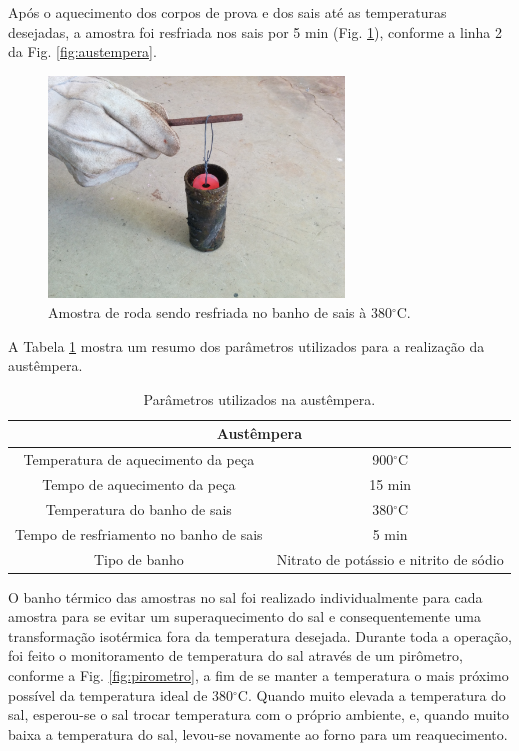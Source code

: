 \documentclass[
12pt,
openany, %
oneside, %
a4paper,			
english,			
brazil			        %
]{abntbibufjf}
\begin{document}
	Após o aquecimento dos corpos de prova e dos sais até as temperaturas desejadas, a amostra foi resfriada nos sais por 5 min (Fig. \ref{fig:resfriamento}), conforme a linha 2 da Fig. \ref{fig:austempera}.
	
	\begin{figure}[H]
		\centering
		\includegraphics[width=0.7\textwidth]{resfriamento}
		\caption{Amostra de roda sendo resfriada no banho de sais à 380$^{\circ}$C.}
		\label{fig:resfriamento}
	\end{figure}

	A Tabela \ref{tab:parametros_austempera} mostra um resumo dos parâmetros utilizados para a realização da austêmpera.
	
	\begin{table}[H]
		\centering
		\caption{Parâmetros utilizados na austêmpera.}
		\begin{tabular}{|cc|}
			\hline
			\multicolumn{2}{|c|}{Austêmpera} \bigstrut\\
			\hline
			Temperatura de aquecimento da peça & 900$^\circ$C \bigstrut[t]\\
			Tempo de aquecimento da peça & 15 min \\
			Temperatura do banho de sais & 380$^\circ$C \\
			Tempo de resfriamento no banho de sais & 5 min \\
			Tipo de banho & Nitrato de potássio e nitrito de sódio \bigstrut[b]\\
			\hline
		\end{tabular}%
		\label{tab:parametros_austempera}%
	\end{table}%
	

	O banho térmico das amostras no sal foi realizado individualmente para cada amostra para se evitar um superaquecimento do sal e consequentemente uma transformação isotérmica fora da temperatura desejada. Durante toda a operação, foi feito o monitoramento de temperatura do sal através de um pirômetro, conforme a Fig. \ref{fig:pirometro}, a fim de se manter a temperatura o mais próximo possível da temperatura ideal de 380$^{\circ}$C. Quando muito elevada a temperatura do sal, esperou-se o sal trocar temperatura com o próprio ambiente, e, quando muito baixa a temperatura do sal, levou-se novamente ao forno para um reaquecimento.
	
\end{document}
